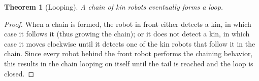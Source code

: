 \documentclass[conference]{IEEEtran}
\newtheorem{theorem}{Theorem}
\begin{document}
\begin{theorem}[Looping]
  A chain of kin robots eventually forms a loop.
\end{theorem}
\begin{proof}
  When a chain is formed, the robot in front either detects a kin, in which case
  it follows it (thus growing the chain); or it does not detect a kin, in which
  case it moves clockwise until it detects one of the kin robots that follow it
  in the chain. Since every robot behind the front robot performs the chaining
  behavior, this results in the chain looping on itself until the tail is
  reached and the loop is closed.
\end{proof}


\end{document}
